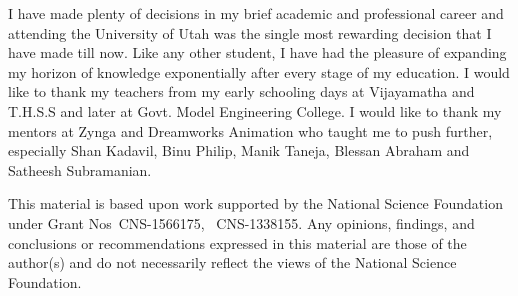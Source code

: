 I have made plenty of decisions in my brief academic and professional career and attending the University of Utah was the single most rewarding decision that I have made till now. 
Like any other student, I have had the pleasure of expanding my horizon of knowledge exponentially after every stage of my education. 
I would like to thank my teachers from my early schooling days at Vijayamatha and T.H.S.S and later at Govt. Model Engineering College. 
I would like to thank my mentors at Zynga and Dreamworks Animation who taught me to push further, especially Shan Kadavil, Binu Philip, Manik Taneja, Blessan Abraham and Satheesh Subramanian.

This material is based upon work supported by the National Science Foundation under Grant Nos\ CNS-1566175, \ CNS-1338155.
Any opinions, findings, and conclusions or recommendations expressed in this material are those of the author(s) and do not necessarily reflect the views of the National Science Foundation.